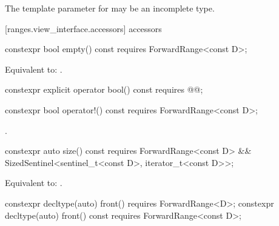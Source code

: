 \pnum
The template parameter for  may be an incomplete type.

[ranges.view_interface.accessors]{ accessors}

%
\begin{itemdecl}
constexpr bool empty() const requires ForwardRange<const D>;
\end{itemdecl}

\begin{itemdescr}
\pnum
\effects Equivalent to: .
\end{itemdescr}

%
\begin{itemdecl}
constexpr explicit operator bool() const
  requires @@;
\end{itemdecl}

\begin{itemdescr}
\pnum
{}
\end{itemdescr}

\begin{removedblock}
%
\begin{itemdecl}
constexpr bool operator!() const requires ForwardRange<const D>;
\end{itemdecl}

\begin{itemdescr}
\pnum
\returns {}.
\end{itemdescr}
\end{removedblock}

%
\begin{itemdecl}
constexpr auto size() const requires ForwardRange<const D> &&
SizedSentinel<sentinel_t<const D>, iterator_t<const D>>;
\end{itemdecl}

\begin{itemdescr}
\pnum
\effects Equivalent to: .
\end{itemdescr}

%
\begin{itemdecl}
constexpr decltype(auto) front() requires ForwardRange<D>;
constexpr decltype(auto) front() const requires ForwardRange<const D>;
\end{itemdecl}

